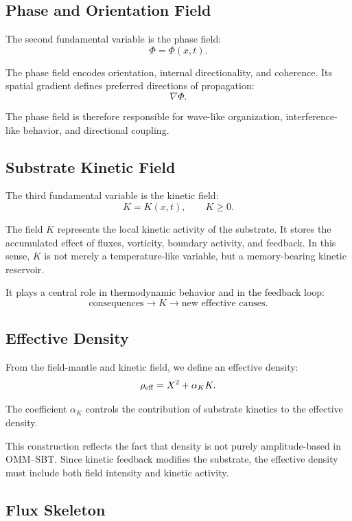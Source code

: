 \documentclass[11pt]{article}
\begin{document}
\subsection{Phase and Orientation Field}

The second fundamental variable is the phase field:
\[
\Phi = \Phi(x,t).
\]

The phase field encodes orientation, internal directionality, and coherence. Its spatial gradient defines preferred directions of propagation:
\[
\nabla \Phi.
\]

The phase field is therefore responsible for wave-like organization, interference-like behavior, and directional coupling.

\subsection{Substrate Kinetic Field}

The third fundamental variable is the kinetic field:
\[
K = K(x,t), \qquad K \geq 0.
\]

The field $K$ represents the local kinetic activity of the substrate. It stores the accumulated effect of fluxes, vorticity, boundary activity, and feedback. In this sense, $K$ is not merely a temperature-like variable, but a memory-bearing kinetic reservoir.

It plays a central role in thermodynamic behavior and in the feedback loop:
\[
\text{consequences} \rightarrow K \rightarrow \text{new effective causes}.
\]

\subsection{Effective Density}

From the field-mantle and kinetic field, we define an effective density:
\[
\rho_{\rm eff} = X^2 + \alpha_K K.
\]

The coefficient $\alpha_K$ controls the contribution of substrate kinetics to the effective density.

This construction reflects the fact that density is not purely amplitude-based in OMM--SBT. Since kinetic feedback modifies the substrate, the effective density must include both field intensity and kinetic activity.

\subsection{Flux Skeleton}
\end{document}
